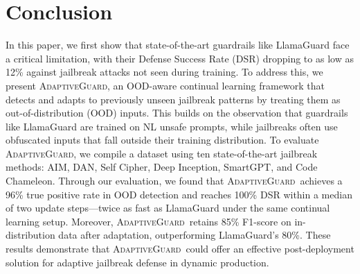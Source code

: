 \documentclass[10pt,conference, review]{IEEEtran}
\newcommand{\ourapp}{\textsc{AdaptiveGuard}\xspace}
\begin{document}
\maketitle













%



\section{Conclusion}
In this paper, we first show that state-of-the-art guardrails like LlamaGuard face a critical limitation, with their Defense Success Rate (DSR) dropping to as low as 12\% against jailbreak attacks not seen during training.
To address this, we present \ourapp, an OOD-aware continual learning framework that detects and adapts to previously unseen jailbreak patterns by treating them as out-of-distribution (OOD) inputs. This builds on the observation that guardrails like LlamaGuard are trained on NL unsafe prompts, while jailbreaks often use obfuscated inputs that fall outside their training distribution.
To evaluate \ourapp, we compile a dataset using ten state-of-the-art jailbreak methods: AIM, DAN, Self Cipher, Deep Inception, SmartGPT, and Code Chameleon.
Through our evaluation, we found that \ourapp~achieves a 96\% true positive rate in OOD detection and reaches 100\% DSR within a median of two update steps—twice as fast as LlamaGuard under the same continual learning setup.
Moreover, \ourapp~retains 85\% F1-score on in-distribution data after adaptation, outperforming LlamaGuard’s 80\%. These results demonstrate that \ourapp~could offer an effective post-deployment solution for adaptive jailbreak defense in dynamic production.


\balance


\end{document}
